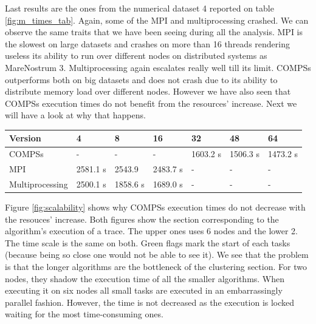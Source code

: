Last results are the ones from the numerical dataset 4 reported on table \ref{fig:m_times_tab}. Again, some of the MPI and multiprocessing crashed. We can observe the same traits that we have been seeing during all the analysis. MPI is the slowest on large datasets and crashes on more than 16 threads rendering useless its ability to run over different nodes on distributed systems as MareNostrum 3. Multiprocessing again escalates really well till its limit. COMPSs outperforms both on big datasets and does not crash due to its ability to distribute memory load over different nodes. However we have also seen that COMPSs execution times do not benefit from the resources' increase. Next we will have a look at why that happens.
\begin{center}
	\begin{tabular}{| C{3cm} | C{2cm} | C{2cm} | C{2cm} | C{2cm} |  C{2cm} | C{2cm} |}
	\hline
	Version & 4 & 8 & 16 & 32 & 48 & 64 \\ 
	\hline \hline
	COMPSs & - & - & - & 1603.2 s & 1506.3 s & 1473.2 s\\
	\hline 
	MPI & 2581.1 s & 2543.9   & 2483.7 s & -  & - & - \\
	\hline
	Multiprocessing & 2500.1 s & 1858.6 s & 1689.0 s & -  & -  & - \\
	\hline
	\end{tabular}
	\label{fig:m_times_tab}
\end{center}


Figure \ref{fig:scalability} shows why COMPSs execution times do not decrease with the resouces' increase. Both figures show the section corresponding to the algorithm's execution of a trace. The upper ones uses 6 nodes and the lower 2. The time scale is the same on both. Green flags mark the start of each tasks (because being so close one would not be able to see it). We see that the problem is that the longer algorithms are the bottleneck of the clustering section. For two nodes, they shadow the execution time of all the smaller algorithms. When executing it on six nodes all small tasks are executed in an embarrassingly parallel fashion. However, the time is not decreased as the execution is locked waiting for the most time-consuming ones.

